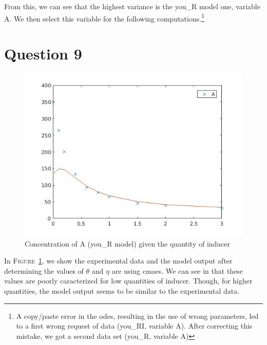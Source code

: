 \documentclass[11pt,a4paper]{report}
\begin{document}
From this, we can see that the highest variance is the you\_R model one, variable A. We then select this variable for the following computations.\footnote{A copy/paste error in the odes, resulting in the use of wrong parameters, led to a first wrong request of data (you\_RI, variable A). After correcting this mistake, we got a second data set (you\_R, variable A)}

\section*{Question 9}

\begin{figure}[!ht]
  \begin{center}
    \includegraphics[width=0.7\linewidth]{Figure8.jpg}
    \caption{Concentration of A (you\_R model) given the quantity of inducer}
    \label{q9}
  \end{center}
\end{figure}

In \textsc{Figure}~\ref{q9}, we show the experimental data and the model output after determining the values of $\theta$ and $\eta$ are using cmaes. We can see in that these values are poorly caracterized for low quantities of inducer. Though, for higher quantities, the model output seems to be similar to the experimental data. \\
\end{document}
